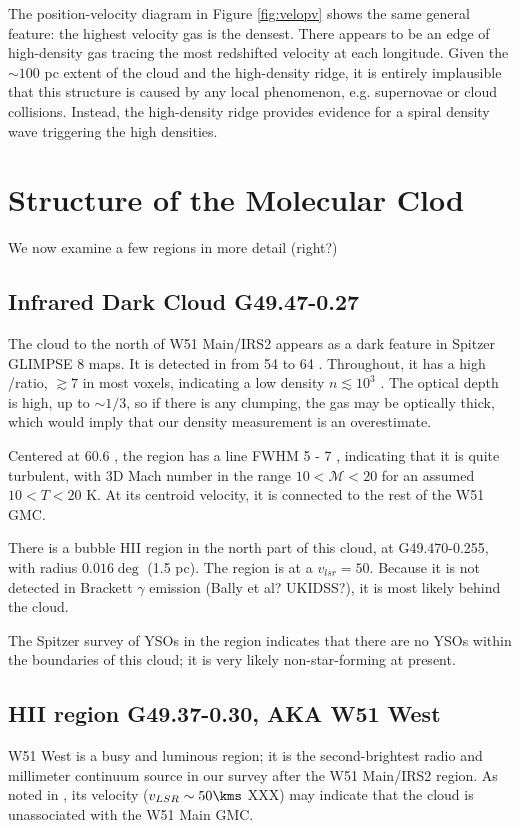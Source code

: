 The position-velocity diagram in Figure \ref{fig:velopv} shows the same general
feature: the highest velocity gas is the densest.  There appears to be an edge
of high-density gas tracing the most redshifted velocity at each longitude.
Given the $\sim100$ pc extent of the cloud and the high-density ridge, it is
entirely implausible that this structure is caused by any local phenomenon,
e.g. supernovae or cloud collisions.  Instead, the high-density ridge provides
evidence for a spiral density wave triggering the high densities.

\section{Structure of the Molecular Clod}
We now examine a few regions in more detail (right?)

\subsection{Infrared Dark Cloud G49.47-0.27}
The cloud to the north of W51 Main/IRS2 appears as a dark feature in Spitzer
GLIMPSE 8 \um maps.  It is detected in \formaldehyde from 54 to 64
\kms.  Throughout, it has a high \oneone/\twotwo ratio, $\gtrsim7$ in
most voxels, indicating a low density $n\lesssim10^3$ \percc.  The \oneone
optical depth is high, up to $\sim1/3$, so if there is any clumping, the gas
may be optically thick, which would imply that our density measurement is an
overestimate.

Centered at 60.6 \kms, the region has a line FWHM 5 - 7 \kms, indicating that
it is quite turbulent, with 3D Mach number in the range $10 < \mathcal{M} < 20$
for an assumed $10 < T < 20$ K.  At its centroid velocity, it is connected
to the rest of the W51 GMC.

There is a bubble HII region in the north part of this cloud, at G49.470-0.255,
with radius $0.016\deg$ (1.5 pc).  The \hii region is at a $v_{lsr}=50$\kms.
Because it is not detected in Brackett $\gamma$ emission (Bally et al?
UKIDSS?), it is most likely behind the cloud.

The \citet{Kang2009a} Spitzer survey of YSOs in the region indicates that there
are no YSOs within the boundaries of this cloud; it is very likely
non-star-forming at present.

\subsection{HII region G49.37-0.30, AKA W51 West}
W51 West is a busy and luminous \hii region; it is the second-brightest radio
and millimeter continuum source in our survey after the W51 Main/IRS2 region.
As noted in \citet{Carpenter1998a}, its velocity ($v_{LSR}\sim 50\kms$ XXX) 
may indicate that the cloud is unassociated with the W51 Main GMC.



